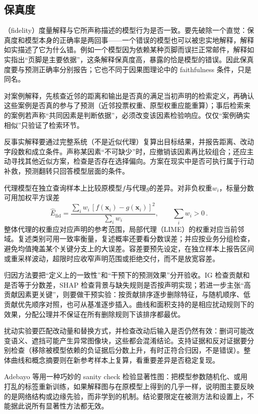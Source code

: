 \subsection{保真度}
\label{sec:interpretability-quality-fidelity}

（fidelity）度量解释与它所声称描述的模型行为是否一致。要先破除一个直觉：保真度和模型本身的正确率是两回事——一个错误的模型也可以被忠实地解释，解释如实描述了它为什么错。例如一个模型因为依赖某种页脚而误拦正常邮件，解释如实指出“页脚是主要依据”，这条解释保真度高，暴露的恰是模型的错误。因此保真度要与预测正确率分别报告；它也不同于因果图理论中的 faithfulness 条件，只是同名。

对案例解释，先核查近邻的距离和输出是否真的满足当初声明的检索定义，再确认这些案例是否真的参与了预测（近邻投票权重、原型权重应能重算）；事后检索来的案例若声称“共同因素是判断依据”，必须改变该因素检验响应。仅仅“案例确实相似”只验证了检索环节。

反事实解释要通过完整系统（不是近似代理）复算出目标结果，并报告距离、改动字段数和成立条件。声称某因素“不可缺少”时，应撤销该因素再比较组合；还应主动寻找其他近似方案，检查是否存在选择偏向。方案在现实中是否可执行属于行动补救，预测翻转只回答模型层面的条件。

代理模型在独立查询样本上比较原模型$f$与代理$g$的差异。对非负权重$w_i$，标量分数可用加权平方误差
\[
 \widehat E_{\mathrm{fid}}
 =\frac{\sum_i w_i\,[f(\bm{x}_i)-g(\bm{x}_i)]^2}
        {\sum_i w_i},\qquad \sum_iw_i>0\, .
\]
整体代理的权重应对应声明的参考范围，局部代理（LIME）的权重对应当前邻域。复述类别可用一致率衡量，复述概率还要看分数误差；并应按业务分组检查，避免均值掩盖某个关键分支上的大误差。容差要预先设定，在独立样本上报告区间或重采样波动，超限时应收窄声明范围或拒绝交付，而不是放宽容差。

归因方法要把“定义上的一致性”和“干预下的预测效果”分开验收。IG 检查贡献和是否等于分数差，SHAP 检查背景与缺失规则是否按声明实现；若进一步主张“高贡献因素更关键”，则要做干预实验：按贡献排序逐步删除特征，与随机顺序、低贡献优先顺序对照，也可从基准逐步插入。曲线和面积支持的是相应扰动规则下的效果，分配公理并不保证在所有删除规则下该排序都最优。

扰动实验要匹配改动量和替换方式，并检查改动后输入是否仍然有效：删词可能改变语义、遮挡可能产生异常图像块，这些都会混淆结论。支持证据和反对证据要分别检查（移除被模型依赖的负证据后分数上升，有时正符合归因，不是错误）。整体曲线和概念摘要则在新参考样本上复算，看重要差异是否稳定复现。

Adebayo 等用一种巧妙的 sanity check 检验显著性图：把模型参数随机化、或用打乱的标签重新训练，如果解释图与在原模型上得到的几乎一样，说明图主要反映的是网络结构或边缘先验，而非学到的机制。结论要限定在被测方法和设置上，不能据此说所有显著性方法都无效。

